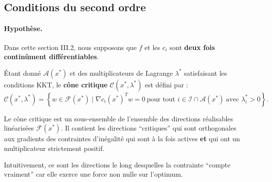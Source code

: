\subsection{Conditions du second ordre}

\paragraph{Hypothèse.} Dans cette section III.2, nous supposons que $f$ et les $c_i$ sont \textbf{deux fois continûment différentiables}.

\begin{definition}
    Étant donné $\mathcal{A}(x^*)$ et des multiplicateurs de Lagrange $\lambda^*$ satisfaisant les conditions KKT, le \textbf{cône critique} $\mathcal{C}(x^*, \lambda^*)$ est défini par :
    \begin{equation}
        \mathcal{C}(x^*, \lambda^*) = \left\{ w \in \mathcal{F}(x^*) \mid \nabla c_i(x^*)^T w = 0 \ \text{pour tout } i \in \mathcal{I} \cap \mathcal{A}(x^*) \ \text{avec } \lambda_i^* > 0 \right\}.
    \end{equation}
\end{definition}

\begin{remarque}
    Le cône critique est un sous-ensemble de l'ensemble des directions réalisables linéarisées $\mathcal{F}(x^*)$. Il contient les directions ``critiques'' qui sont orthogonales aux gradients des contraintes d'inégalité qui sont à la fois actives \textbf{et} qui ont un multiplicateur strictement positif.
    
    Intuitivement, ce sont les directions le long desquelles la contrainte ``compte vraiment'' car elle exerce une force non nulle sur l'optimum.
\end{remarque}

